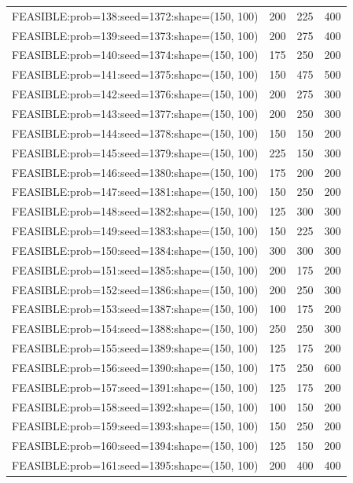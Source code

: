 \begin{longtable}{lccc}
FEASIBLE:prob=138:seed=1372:shape=(150, 100) &  200 &   225 &    400 \\
FEASIBLE:prob=139:seed=1373:shape=(150, 100) &  200 &   275 &    400 \\
FEASIBLE:prob=140:seed=1374:shape=(150, 100) &  175 &   250 &    200 \\
FEASIBLE:prob=141:seed=1375:shape=(150, 100) &  150 &   475 &    500 \\
FEASIBLE:prob=142:seed=1376:shape=(150, 100) &  200 &   275 &    300 \\
FEASIBLE:prob=143:seed=1377:shape=(150, 100) &  200 &   250 &    300 \\
FEASIBLE:prob=144:seed=1378:shape=(150, 100) &  150 &   150 &    200 \\
FEASIBLE:prob=145:seed=1379:shape=(150, 100) &  225 &   150 &    300 \\
FEASIBLE:prob=146:seed=1380:shape=(150, 100) &  175 &   200 &    200 \\
FEASIBLE:prob=147:seed=1381:shape=(150, 100) &  150 &   250 &    200 \\
FEASIBLE:prob=148:seed=1382:shape=(150, 100) &  125 &   300 &    300 \\
FEASIBLE:prob=149:seed=1383:shape=(150, 100) &  150 &   225 &    300 \\
FEASIBLE:prob=150:seed=1384:shape=(150, 100) &  300 &   300 &    300 \\
FEASIBLE:prob=151:seed=1385:shape=(150, 100) &  200 &   175 &    200 \\
FEASIBLE:prob=152:seed=1386:shape=(150, 100) &  200 &   250 &    300 \\
FEASIBLE:prob=153:seed=1387:shape=(150, 100) &  100 &   175 &    200 \\
FEASIBLE:prob=154:seed=1388:shape=(150, 100) &  250 &   250 &    300 \\
FEASIBLE:prob=155:seed=1389:shape=(150, 100) &  125 &   175 &    200 \\
FEASIBLE:prob=156:seed=1390:shape=(150, 100) &  175 &   250 &    600 \\
FEASIBLE:prob=157:seed=1391:shape=(150, 100) &  125 &   175 &    200 \\
FEASIBLE:prob=158:seed=1392:shape=(150, 100) &  100 &   150 &    200 \\
FEASIBLE:prob=159:seed=1393:shape=(150, 100) &  150 &   250 &    200 \\
FEASIBLE:prob=160:seed=1394:shape=(150, 100) &  125 &   150 &    200 \\
FEASIBLE:prob=161:seed=1395:shape=(150, 100) &  200 &   400 &    400 \\

\end{longtable}
